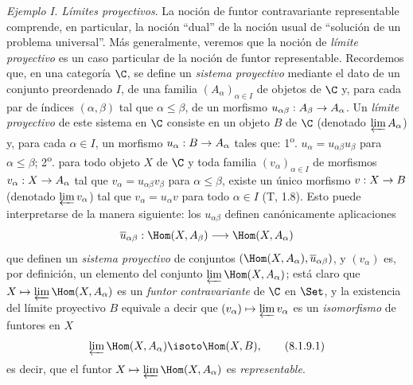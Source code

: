 \documentclass[oneside]{amsart}
\makeatletter
\renewcommand{\leq}{\leqslant}
\newcommand{\ega@arrow}[2]{\mathchoice{#1}{#2}{#2}{#2}}
\let\ega@shortmapsto\mapsto
\renewcommand{\to}{\ega@arrow{\longrightarrow}{\rightarrow}}
\renewcommand{\mapsto}{\ega@arrow{\longmapsto}{\ega@shortmapsto}}
\newcommand{\oldpage}[2][]{{\marginnote{\normalfont\textbf{#1}~|~#2}}\ignorespaces}
\let\EGAOriginalLabel\label
\renewcommand{\label}[1]{\phantomsection\EGAOriginalLabel{#1}}
\makeatother
\begin{document}
\begin{env}[8.1.9]
\label{0.8.1.9}
\textit{Ejemplo I. Límites proyectivos}.
La noción de funtor contravariante representable comprende, en particular, la noción ``dual'' de la noción usual de ``solución de un problema universal''.
\oldpage[0\textsubscript{III}]{8}
Más generalmente, veremos que la noción de \emph{límite proyectivo} es un caso particular de la noción de funtor representable.
Recordemos que, en una categoría $\C$, se define un \emph{sistema proyectivo} mediante el dato de un conjunto preordenado $I$, de una familia $(A_\alpha)_{\alpha\in I}$ de objetos de $\C$ y, para cada par de índices $(\alpha,\beta)$ tal que $\alpha\leq\beta$, de un morfismo $u_{\alpha\beta}:A_\beta\to A_\alpha$.
Un \emph{límite proyectivo} de este sistema en $\C$ consiste en un objeto $B$ de $\C$ (denotado $\varprojlim A_\alpha$) y, para cada $\alpha\in I$, un morfismo $u_\alpha:B\to A_\alpha$ tales que: 1\textsuperscript{o}. $u_\alpha=u_{\alpha\beta}u_\beta$ para $\alpha\leq\beta$; 2\textsuperscript{o}. para todo objeto $X$ de $\C$ y toda familia $(v_\alpha)_{\alpha\in I}$ de morfismos $v_\alpha:X\to A_\alpha$ tal que $v_\alpha=u_{\alpha\beta}v_\beta$ para $\alpha\leq\beta$, existe un único morfismo $v:X\to B$ (denotado $\varprojlim v_\alpha$) tal que $v_\alpha=u_\alpha v$ para todo $\alpha\in I$ (T, 1.8).
Esto puede interpretarse de la manera siguiente: los $u_{\alpha\beta}$ definen canónicamente aplicaciones
\[
  \overline{u}_{\alpha\beta}:\Hom(X,A_\beta)\to\Hom(X,A_\alpha)
\]
que definen un \emph{sistema proyectivo} de conjuntos $(\Hom(X,A_\alpha),\overline{u}_{\alpha\beta})$, y $(v_\alpha)$ es, por definición, un elemento del conjunto $\varprojlim\Hom(X,A_\alpha)$; está claro que $X\mapsto\varprojlim\Hom(X,A_\alpha)$ es un \emph{funtor contravariante} de $\C$ en $\Set$, y la existencia del límite proyectivo $B$ equivale a decir que $(v_\alpha)\mapsto\varprojlim v_\alpha$ es un \emph{isomorfismo} de funtores en $X$
\[
  \varprojlim\Hom(X,A_\alpha)\isoto\Hom(X,B),
  \tag{8.1.9.1}
\]
es decir, que el funtor $X\mapsto\varprojlim\Hom(X,A_\alpha)$ es \emph{representable}.
\end{env}
\end{document}

